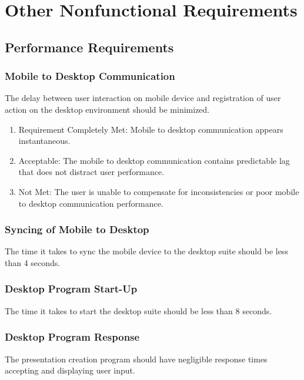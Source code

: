 \documentclass{article}
\begin{document}
\newpage
\section{Other Nonfunctional Requirements}
\subsection{Performance Requirements}
\subsubsection{Mobile to Desktop Communication}
The delay between user interaction on mobile device and registration of user action on the desktop environment should be minimized.
\begin{enumerate}
    \item Requirement Completely Met: Mobile to desktop communication appears instantaneous.
    \item Acceptable: The mobile to desktop communication contains predictable lag that does not distract user performance.
    \item Not Met: The user is unable to compensate for inconsistencies or poor mobile to desktop communication performance.
\end{enumerate}

\subsubsection{Syncing of Mobile to Desktop}
The time it takes to sync the mobile device to the desktop suite should be less than 4 seconds.

\subsubsection{Desktop Program Start-Up}
The time it takes to start the desktop suite should be less than 8 seconds.

\subsubsection{Desktop Program Response}
The presentation creation program should have negligible response times accepting and displaying user input.
\end{document}
